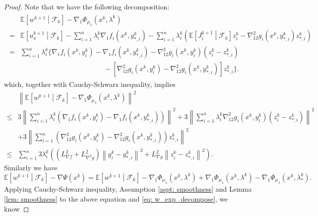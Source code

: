 \documentclass[10pt]{article}
\theoremstyle{remark}
\def\setF{\mathscr{F}} %
\newcommand{\E}{\mathbb{E}}
\newcommand{\norm}[1]{\left\|#1\right\|}
\begin{document}
\begin{proof}
Note that we have the following decomposition:
\begin{align}\label{eq: w_exp_decompose}
    \begin{aligned}
        &\E\left[w^{k+1}\middle|\setF_k\right] - \nabla_1\Phi_{\mu_{\lambda}}(x^k, \lambda^k) \\
        = &\E\left[u_x^{k+1}\middle|\setF_k\right] - \sum_{i=1}^{n}\lambda_i^k\nabla_1 f_i(x^k, y_{*,i}^k) - \sum_{i=1}^{n}\lambda_i^k \left(\E\left[J_i^{k+1}\middle|\setF_k\right]z_i^k - \nabla_{12}^2g_i(x^k,y_{*,i}^k)z_{*,i}^k\right) \\
        = &\sum_{i=1}^{n}\lambda_i^k\bigg\{\nabla_1 f_i(x^k, y_i^k) - \nabla_1 f_i(x^k, y_{*,i}^k) -  \nabla_{12}^2g_i(x^k, y_i^k)\left( z_i^k - z_{*,i}^k\right)\\
        & \hspace{12em} - \left[\nabla_{12}^2g_i(x^k, y_i^k) - \nabla_{12}^2g_i(x^k,y_{*,i}^k)\right]z_{*,i}^k\bigg\}.
    \end{aligned}
\end{align}
which, together with Cauchy-Schwarz inequality, implies
\begin{align*}
    &\norm{\E\left[w^{k+1}\middle|\setF_k\right] - \nabla_1\Phi_{\mu_{\lambda}}(x^k, \lambda^k)}^2 \\
    \leq &3\norm{\sum_{i=1}^{n}\lambda_i^k \left(\nabla_1 f_i(x^k, y_i^k) - \nabla_1 f_i(x^k, y_{*,i}^k)\right)}^2 + 3\norm{\sum_{i=1}^{n}\lambda_i^k\nabla_{12}^2g_i(x^k, y_i^k)\left( z_i^k - z_{*,i}^k\right)}^2\\
    & + 3\norm{\sum_{i=1}^{n}\left(\nabla_{12}^2g_i(x^k, y_i^k) - \nabla_{12}^2g_i(x^k,y_{*,i}^k)\right)z_{*,i}^k}^2\\
    \leq &\sum_{i=1}^{n}3\lambda_i^k \left(\left(L_{\nabla f}^2 + L_{\nabla^2 g}^2\right)\norm{y_i^k - y_{*,i}^k}^2 + L_{\nabla g}^2\norm{z_i^k - z_{*,i}^k}^2\right).
\end{align*}
Similarly we have
\[
    \E\left[w^{k+1}\middle|\setF_k\right] - \nabla\Psi(x^k) = \E\left[w^{k+1}\middle|\setF_k\right] - \nabla_1\Phi_{\mu_{\lambda}}(x^k, \lambda^k) + \nabla_1\Phi_{\mu_{\lambda}}(x^k, \lambda^k) - \nabla_1\Phi_{\mu_{\lambda}}(x^k, \lambda_*^k).
\]
Applying Cauchy-Schwarz inequality, Assumption \ref{aspt: smoothness} and Lemma \ref{lem: smoothness} to the above equation and \eqref{eq: w_exp_decompose}, we know

\end{proof}
\end{document}
